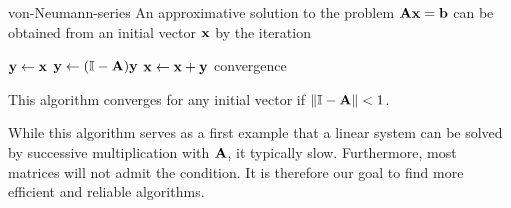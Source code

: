 \begin{Algorithm}{von-Neumann-series}
  An approximative solution to the problem $\mathbf A\mathbf x = \mathbf b$ can
  be obtained from an initial vector $\mathbf x$ by the iteration
  \begin{algorithmic}
    \State $\mathbf y \gets \mathbf x$
    \Repeat
    \State $\mathbf y \gets (\mathbb I-\mathbf A) \mathbf y$
    \State $\mathbf x \gets \mathbf x + \mathbf y$
    \Until convergence
  \end{algorithmic}
  This algorithm converges for any initial vector if $\lVert\mathbb I-\mathbf A\rVert< 1$.
\end{Algorithm}

\begin{intro}
  While this algorithm serves as a first example that a linear system
  can be solved by successive multiplication with $\mathbf A$, it
  typically slow. Furthermore, most matrices will not admit the
  condition. It is therefore our goal to find more efficient and
  reliable algorithms.
\end{intro}

